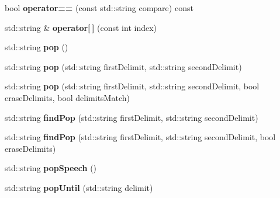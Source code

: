\begin{DoxyCompactItemize}
\item 
\hypertarget{classStringstack_a8afc987bc55cf92fcf9eadcbb8c978b8}{bool {\bfseries operator==} (const std\-::string compare) const }\label{classStringstack_a8afc987bc55cf92fcf9eadcbb8c978b8}

\item 
\hypertarget{classStringstack_a53a36a2da20ea60f2c9df67506f3748b}{std\-::string \& {\bfseries operator\mbox{[}$\,$\mbox{]}} (const int index)}\label{classStringstack_a53a36a2da20ea60f2c9df67506f3748b}

\item 
\hypertarget{classStringstack_a8a9777f29361b6e493108a234f89b81d}{std\-::string {\bfseries pop} ()}\label{classStringstack_a8a9777f29361b6e493108a234f89b81d}

\item 
\hypertarget{classStringstack_a991eff1393a30e44e8b327501c10c417}{std\-::string {\bfseries pop} (std\-::string first\-Delimit, std\-::string second\-Delimit)}\label{classStringstack_a991eff1393a30e44e8b327501c10c417}

\item 
\hypertarget{classStringstack_afa99c109a0b5c1632a6402780dbcc97d}{std\-::string {\bfseries pop} (std\-::string first\-Delimit, std\-::string second\-Delimit, bool erase\-Delimits, bool delimits\-Match)}\label{classStringstack_afa99c109a0b5c1632a6402780dbcc97d}

\item 
\hypertarget{classStringstack_a71b03b6b0c5d15074abde46944d71864}{std\-::string {\bfseries find\-Pop} (std\-::string first\-Delimit, std\-::string second\-Delimit)}\label{classStringstack_a71b03b6b0c5d15074abde46944d71864}

\item 
\hypertarget{classStringstack_ad378b6dd8a9d55605d3c17b452fd5dda}{std\-::string {\bfseries find\-Pop} (std\-::string first\-Delimit, std\-::string second\-Delimit, bool erase\-Delimits)}\label{classStringstack_ad378b6dd8a9d55605d3c17b452fd5dda}

\item 
\hypertarget{classStringstack_ab1db05c3fe40c98493b6e02134eb8d64}{std\-::string {\bfseries pop\-Speech} ()}\label{classStringstack_ab1db05c3fe40c98493b6e02134eb8d64}

\item 
\hypertarget{classStringstack_afd03c9d391bfd931ffb35e544230b402}{std\-::string {\bfseries pop\-Until} (std\-::string delimit)}\label{classStringstack_afd03c9d391bfd931ffb35e544230b402}


\end{DoxyCompactItemize}
